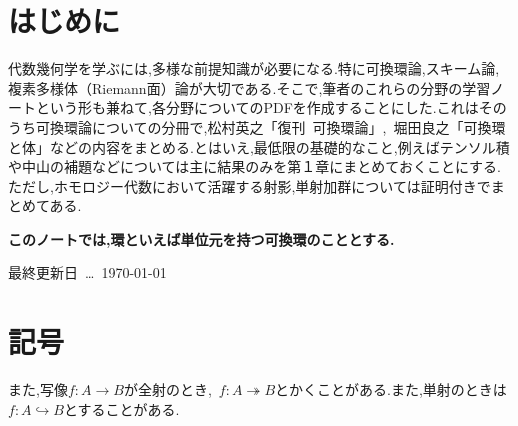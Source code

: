 \documentclass[autodetect-engine,dvi=dvipdfmx,ja=standard,japaram={units}]{bxjsarticle} %
\begin{document}
	\nocite{*}
	\newpage
	\part*{はじめに}
	代数幾何学を学ぶには,多様な前提知識が必要になる.特に可換環論,スキーム論,複素多様体（Riemann面）論が大切である.そこで,筆者のこれらの分野の学習ノートという形も兼ねて,各分野についてのPDFを作成することにした.これはそのうち可換環論についての分冊で,松村英之「復刊~可換環論」\cite{matsu},~堀田良之「可換環と体」\cite{hota2}などの内容をまとめる.とはいえ,最低限の基礎的なこと,例えばテンソル積や中山の補題などについては主に結果のみを第１章にまとめておくことにする.ただし,ホモロジー代数において活躍する射影,単射加群については証明付きでまとめてある.
	
	\textbf{このノートでは,環といえば単位元を持つ可換環のこととする.}
	
	\hspace*{\fill}最終更新日~\dots~\today
	
	\part*{記号}
	
	
	また,写像$f:A\to B$が全射のとき,~$f:A\twoheadrightarrow B$とかくことがある.また,単射のときは$f:A\hookrightarrow B$とすることがある.
	\newpage
	
	\tableofcontents
	
	
	\def\prepartname{付録}
	\def\postpartname{}
	\thepartchange
%	 
	
	
	\printindex
	
	\newpage
	
	
\end{document}
